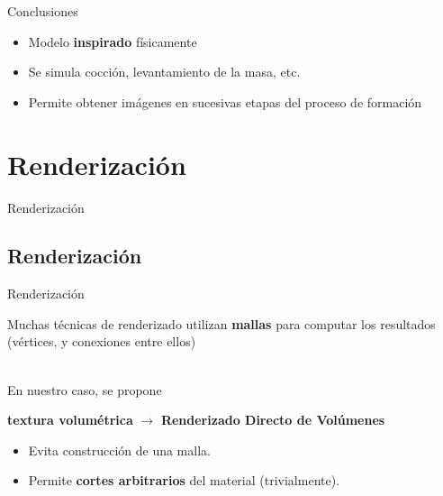 \documentclass[spanish,unknownkeysallowed]{beamer}
\begin{document}
\begin{frame}{Conclusiones}
\begin{block}{}
\begin{itemize}
\item Modelo \textbf{inspirado} físicamente
\item Se simula cocción, levantamiento de la masa, etc.
\item Permite obtener imágenes en sucesivas etapas del proceso de formación
\end{itemize}
\end{block}
\end{frame}

\section{Renderización}


\begin{frame}
\begin{block}{}
\begin{center}
\vspace{1cm}
\huge{Renderización}
\vspace{1cm}
\end{center}
\end{block}
\end{frame}


\subsection{Renderización}

\begin{frame}{Renderización}

Muchas técnicas de renderizado utilizan \textbf{mallas} para computar los resultados (vértices, y conexiones entre ellos)

\ \\

En nuestro caso, se propone

\textbf{textura volumétrica} $\rightarrow$ \textbf{Renderizado Directo de Volúmenes}

\begin{itemize}
\item Evita construcción de una malla.
\item Permite \textbf{cortes arbitrarios} del material (trivialmente).
\end{itemize}

\end{frame}
\end{document}
